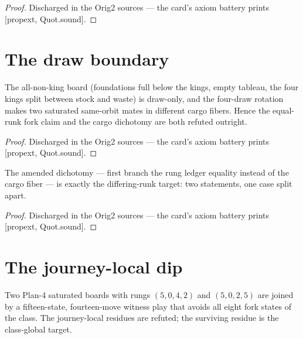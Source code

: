 \begin{proof}
\leanok
Discharged in the Orig2 sources --- the card's axiom battery prints [propext, Quot.sound].
\end{proof}

\section{The draw boundary}

\begin{theorem}\label{thm:drawBoundary}
\leanok
{}
The all-non-king board (foundations full below the kings, empty
tableau, the four kings split between stock and waste) is
draw-only, and the four-draw rotation makes two saturated
same-orbit mates in different cargo fibers.  Hence the equal-runk
fork claim and the cargo dichotomy are both refuted outright.
\end{theorem}

\begin{proof}
\leanok
Discharged in the Orig2 sources --- the card's axiom battery prints [propext, Quot.sound].
\end{proof}

\begin{theorem}\label{thm:amended}
\leanok
{}
The amended dichotomy --- first branch the rung ledger equality
instead of the cargo fiber --- is exactly the differing-runk
target: two statements, one case split apart.
\end{theorem}

\begin{proof}
\leanok
Discharged in the Orig2 sources --- the card's axiom battery prints [propext, Quot.sound].
\end{proof}

\section{The journey-local dip}

\begin{theorem}\label{thm:dipFalse}
\leanok
{}
Two Plan-4 saturated boards with rungs $(5,0,4,2)$ and
$(5,0,2,5)$ are joined by a fifteen-state, fourteen-move witness
play that avoids all eight fork states of the class.  The
journey-local residues are refuted; the surviving residue is the
class-global target.
\end{theorem}

